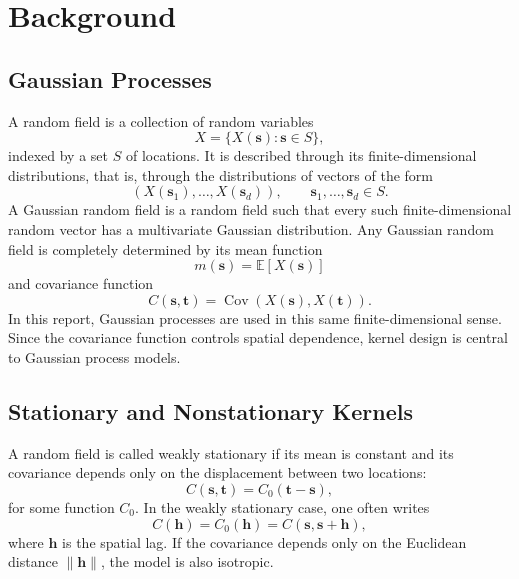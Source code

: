 \documentclass[11pt,a4paper]{article}
\begin{document}
\section{Background}


\subsection{Gaussian Processes}

A random field is a collection of random variables
\begin{equation}
  X = \{X(\mathbf{s}) : \mathbf{s}\in S\},
\end{equation}
indexed by a set $S$ of locations. It is described through its finite-dimensional distributions, that is, through the distributions of vectors of the form
\begin{equation}
  \left(X(\mathbf{s}_1), \ldots, X(\mathbf{s}_d)\right),
  \qquad \mathbf{s}_1,\ldots,\mathbf{s}_d\in S.
\end{equation}
A Gaussian random field is a random field such that every such finite-dimensional random vector has a multivariate Gaussian distribution. Any Gaussian random field is completely determined by its mean function
\begin{equation}
  m(\mathbf{s}) = \mathbb{E}[X(\mathbf{s})]
\end{equation}
and covariance function
\begin{equation}
  C(\mathbf{s},\mathbf{t}) = \operatorname{Cov}(X(\mathbf{s}),X(\mathbf{t})).
\end{equation}
In this report, Gaussian processes are used in this same finite-dimensional sense. Since the covariance function controls spatial dependence, kernel design is central to Gaussian process models.

\subsection{Stationary and Nonstationary Kernels}

A random field is called weakly stationary if its mean is constant and its covariance depends only on the displacement between two locations:
\begin{equation}
  C(\mathbf{s}, \mathbf{t}) = C_0(\mathbf{t}-\mathbf{s}),
\end{equation}
for some function $C_0$. In the weakly stationary case, one often writes
\begin{equation}
  C(\mathbf{h}) = C_0(\mathbf{h}) = C(\mathbf{s}, \mathbf{s}+\mathbf{h}),
\end{equation}
where $\mathbf{h}$ is the spatial lag. If the covariance depends only on the Euclidean distance $\|\mathbf{h}\|$, the model is also isotropic.
\end{document}

